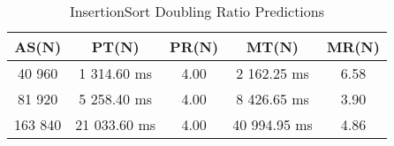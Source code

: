 \begin{table}[hp!]
    \centering
    \begin{tabular} {c | c | c | c | c}
        \textbf{AS(N)} & \textbf{PT(N)} & \textbf{PR(N)} & \textbf{MT(N)} & \textbf{MR(N)} \\
        \hline 
        40 960 & 1 314.60 ms & 4.00 & 2 162.25 ms & 6.58 \\
        \hline
        81 920 & 5 258.40 ms & 4.00 & 8 426.65 ms & 3.90 \\
        \hline
        163 840 & 21 033.60 ms & 4.00 & 40 994.95 ms & 4.86 \\
    \end{tabular}
    \caption{InsertionSort Doubling Ratio Predictions}
\end{table}
